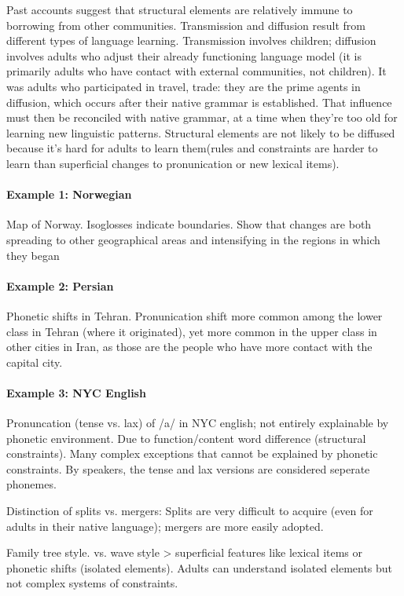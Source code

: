 \documentclass{exam}
\begin{document}
Past accounts suggest that structural elements are relatively immune to borrowing from other communities.
Transmission and diffusion result from different types of language learning.
Transmission involves children; diffusion involves adults who adjust their already functioning language model (it is primarily adults who have contact with external communities, not children). 
It was adults who participated in travel, trade: they are the prime agents in diffusion, which occurs after their native grammar is established. 
That influence must then be reconciled with native grammar, at a time when they're too old for learning new linguistic patterns. 
Structural elements are not likely to be diffused because it's hard for adults to learn them(rules and constraints are harder to learn than superficial changes to pronunication or new lexical items). 

\paragraph{Example 1: Norwegian} Map of Norway. Isoglosses indicate boundaries. Show that changes are both spreading to other geographical areas and intensifying in the regions in which they began

\paragraph{Example 2: Persian} Phonetic shifts in Tehran. Pronunication shift more common among the lower class in Tehran (where it originated), yet more common in the upper class in other cities in Iran, as those are the people who have more contact with the capital city. 

\paragraph{Example 3: NYC English} Pronuncation (tense vs. lax) of /a/ in NYC english; not entirely explainable by phonetic environment. Due to function/content word difference (structural constraints). 
Many complex exceptions that cannot be explained by phonetic constraints. 
By speakers, the tense and lax versions are considered seperate phonemes. 

Distinction of splits vs. mergers: Splits are very difficult to acquire (even for adults in their native language); mergers are more easily adopted. 

Family tree style. vs. wave style > superficial features like lexical items or phonetic shifts (isolated elements). 
Adults can understand isolated elements but not complex systems of constraints. 
\end{document}
